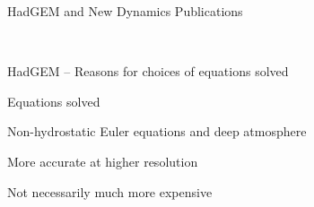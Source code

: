 \begin{slide}{HadGEM and New Dynamics Publications}

\ \\
\begin{list0}
\item {}
\item {}
\item {}
\end{list0}

\end{slide}

\begin{slide}{HadGEM -- Reasons for choices of equations solved}

\item Equations solved
\begin{list1}
\item Non-hydrostatic Euler equations and deep atmosphere
\begin{list2}
\item More accurate at higher resolution
\item Not necessarily much more expensive
\end{list2}

\end{list1}
\end{slide}

